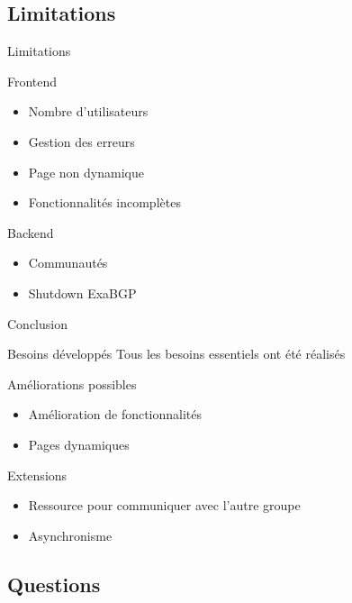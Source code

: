 \subsection{Limitations}
    \begin{frame}{Limitations}
        \begin{block}{Frontend}
            \begin{itemize}
                \item Nombre d'utilisateurs
                \item Gestion des erreurs
                \item Page non dynamique
                \item Fonctionnalités incomplètes
            \end{itemize}
         \end{block}
         \begin{block}{Backend}
            \begin{itemize}
                \item Communautés
                \item Shutdown ExaBGP
            \end{itemize}
         \end{block}

\end{frame}


\begin{frame}{Conclusion}
    \begin{exampleblock}{Besoins développés}
    Tous les besoins essentiels ont été réalisés
    \end{exampleblock}
    \begin{block}{Améliorations possibles}
        \begin{itemize}
            \item Amélioration de fonctionnalités
            \item Pages dynamiques
        \end{itemize}
    \end{block}
    \begin{exampleblock}{Extensions}
        \begin{itemize}
            \item Ressource pour communiquer avec l'autre groupe
            \item Asynchronisme
        \end{itemize}
    \end{exampleblock}
\end{frame}

\subsection{Questions}

{
\begin{frame}[plain]

\end{frame}
}